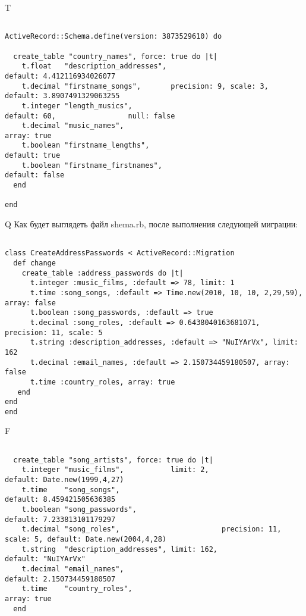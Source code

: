 T
\begin{verbatim}

ActiveRecord::Schema.define(version: 3873529610) do

  create_table "country_names", force: true do |t|
    t.float   "description_addresses",                         default: 4.412116934026077
    t.decimal "firstname_songs",       precision: 9, scale: 3, default: 3.8907491329063255
    t.integer "length_musics",                                 default: 60,                 null: false
    t.decimal "music_names",                                                                             array: true
    t.boolean "firstname_lengths",                             default: true
    t.boolean "firstname_firstnames",                          default: false
  end

end
\end{verbatim}

Q
Как будет выглядеть файл shema.rb, после выполнения следующей миграции:

\begin{verbatim}

class CreateAddressPasswords < ActiveRecord::Migration 
  def change 
    create_table :address_passwords do |t| 
      t.integer :music_films, :default => 78, limit: 1
      t.time :song_songs, :default => Time.new(2010, 10, 10, 2,29,59), array: false
      t.boolean :song_passwords, :default => true
      t.decimal :song_roles, :default => 0.6438040163681071, precision: 11, scale: 5
      t.string :description_addresses, :default => "NuIYArVx", limit: 162
      t.decimal :email_names, :default => 2.150734459180507, array: false
      t.time :country_roles, array: true
   end
end
end
\end{verbatim}

F
\begin{verbatim}

  create_table "song_artists", force: true do |t|
    t.integer "music_films",           limit: 2,                            default: Date.new(1999,4,27)
    t.time    "song_songs",                                                 default: 8.459421505636385
    t.boolean "song_passwords",                                             default: 7.233813101179297
    t.decimal "song_roles",                        precision: 11, scale: 5, default: Date.new(2004,4,28)
    t.string  "description_addresses", limit: 162,                          default: "NuIYArVx"
    t.decimal "email_names",                                                default: 2.150734459180507
    t.time    "country_roles",                                                                              array: true
  end

\end{verbatim}

